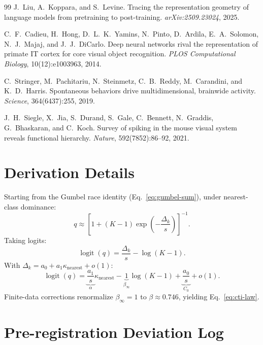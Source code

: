 \documentclass{article}
\DeclareMathOperator{\logit}{logit}
\begin{document}
\begin{thebibliography}{99}
J.~Liu, A.~Koppara, and S.~Levine.
\newblock Tracing the representation geometry of language models from pretraining to post-training.
\newblock \emph{arXiv:2509.23024}, 2025.

C.~F.~Cadieu, H.~Hong, D.~L.~K.~Yamins, N.~Pinto, D.~Ardila, E.~A.~Solomon, N.~J.~Majaj, and J.~J.~DiCarlo.
\newblock Deep neural networks rival the representation of primate {IT} cortex for core visual object recognition.
\newblock \emph{PLOS Computational Biology}, 10(12):e1003963, 2014.

C.~Stringer, M.~Pachitariu, N.~Steinmetz, C.~B.~Reddy, M.~Carandini, and K.~D.~Harris.
\newblock Spontaneous behaviors drive multidimensional, brainwide activity.
\newblock \emph{Science}, 364(6437):255, 2019.

J.~H.~Siegle, X.~Jia, S.~Durand, S.~Gale, C.~Bennett, N.~Graddis, G.~Bhaskaran, and C.~Koch.
\newblock Survey of spiking in the mouse visual system reveals functional hierarchy.
\newblock \emph{Nature}, 592(7852):86--92, 2021.

\end{thebibliography}

\appendix
\section{Derivation Details}
Starting from the Gumbel race identity (Eq.~\ref{eq:gumbel-sum}), under nearest-class dominance:
\[
q\approx\left[1+(K-1)\exp\!\left(-\frac{\Delta_k}{s}\right)\right]^{-1}.
\]
Taking logits:
\[
\logit(q)=\frac{\Delta_k}{s}-\log(K-1).
\]
With $\Delta_k=a_0+a_1\kappa_{\mathrm{nearest}}+o(1)$:
\[
\logit(q)=\underbrace{\frac{a_1}{s}}_{\alpha}\kappa_{\mathrm{nearest}}
-\underbrace{1}_{\beta_\infty}\log(K-1)
+\underbrace{\frac{a_0}{s}}_{C_0}+o(1).
\]
Finite-data corrections renormalize $\beta_\infty=1$ to $\beta\approx0.746$, yielding Eq.~\ref{eq:cti-law}.

\section{Pre-registration Deviation Log}
\label{app:prereg-deviations}
\end{document}

